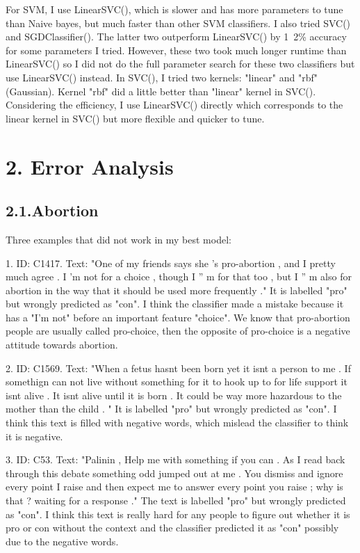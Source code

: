 \documentclass{article}
\begin{document}
For SVM, I use LinearSVC(), which is slower and has more parameters to tune than Naive bayes, but much faster than other SVM classifiers. I also tried SVC() and SGDClassifier(). The latter two outperform LinearSVC() by 1~2\% accuracy for some parameters I tried. However, these two took much longer runtime than LinearSVC() so I did not do the full parameter search for these two classifiers but use LinearSVC() instead. In SVC(), I tried two kernels: "linear" and "rbf" (Gaussian). Kernel "rbf" did a little better than "linear" kernel in SVC(). Considering the efficiency, I use LinearSVC() directly which corresponds to the linear kernel in SVC() but more flexible and quicker to tune.

\section*{2. Error Analysis}
\subsection*{2.1.Abortion}
Three examples that did not work in my best model:

1. ID: C1417. Text: "One of my friends says she 's pro-abortion , and I pretty much agree . I 'm not for a choice , though I '' m for that too , but I '' m also for abortion in the way that it should be used more frequently ."  It is labelled "pro" but wrongly predicted as "con". I think the classifier made a mistake because it has a "I'm  not" before an important feature "choice". We know that pro-abortion people are usually called pro-choice, then the opposite of pro-choice is a negative attitude towards abortion.

2. ID: C1569. Text: "When a fetus hasnt been born yet it isnt a person to me . If somethign can not live without something for it to hook up to for life support it isnt alive . It isnt alive until it is born . It could be way more hazardous to the mother than the child . "  It is labelled "pro" but wrongly predicted as "con". I think this text is filled with negative words, which mislead the classifier to think it is negative. 

3. ID: C53. Text: "Palinin , Help me with something if you can . As I read back through this debate something odd jumped out at me . You dismiss and ignore every point I raise and then expect me to answer every point you raise ; why is that ? waiting for a response ." The text is labelled "pro" but wrongly predicted as "con". I think this text is really hard for any people to figure out whether it is pro or con without the context and the classifier predicted it as "con" possibly due to the negative words. 
\end{document}
